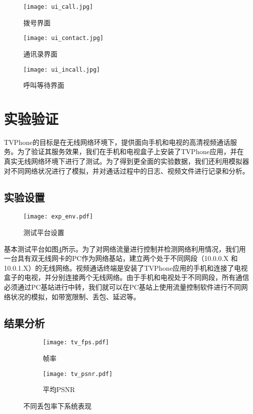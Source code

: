 \begin{figure}[htbp]
  \centering
  \texttt{[image: ui\_call.jpg]}
  \caption{拨号界面}
  \label{fig:ui_call}
\end{figure}

\begin{figure}[htbp]
  \centering
  \texttt{[image: ui\_contact.jpg]}
  \caption{通讯录界面}
  \label{fig:ui_contact}
\end{figure}

\begin{figure}[htbp]
  \centering
  \texttt{[image: ui\_incall.jpg]}
  \caption{呼叫等待界面}
  \label{fig:ui_incall}
\end{figure}

\section{实验验证}

TVPhone的目标是在无线网络环境下，提供面向手机和电视的高清视频通话服务。为了验证其服务效果，我们在手机和电视盒子上安装了TVPhone应用，并在真实无线网络环境下进行了测试。为了得到更全面的实验数据，我们还利用模拟器对不同网络状况进行了模拟，并对通话过程中的日志、视频文件进行记录和分析。

\subsection{实验设置}
\begin{figure}[htbp]
  \centering
  \texttt{[image: exp\_env.pdf]}
  \caption{测试平台设置}
  \label{fig:exp_env}
\end{figure}

基本测试平台如图\ref{fig:exp_env}所示。为了对网络流量进行控制并检测网络利用情况，我们用一台具有双无线网卡的PC作为网络基站，建立两个处于不同网段（10.0.0.X 和10.0.1.X）的无线网络。视频通话终端是安装了TVPhone应用的手机和连接了电视盒子的电视，并分别连接两个无线网络。由于手机和电视处于不同网段，所有通信必须通过PC基站进行中转，我们就可以在PC基站上使用流量控制软件进行不同网络状况的模拟，如带宽限制、丢包、延迟等。


\subsection{结果分析}

\begin{figure}[htbp]
  \begin{subfigure}[b]{0.5\textwidth}
    \centering
    \texttt{[image: tv\_fps.pdf]}
    \caption{帧率}
    \label{pic:tv_fps}
  \end{subfigure}
  \begin{subfigure}[b]{0.5\textwidth}
    \centering
    \texttt{[image: tv\_psnr.pdf]}
    \caption{平均PSNR}
    \label{pic:tv_psnr}
  \end{subfigure}
  \caption{不同丢包率下系统表现}
  \label{fig:tv_loss}
\end{figure}

